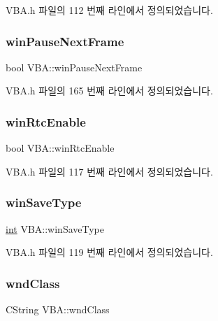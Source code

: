V\+B\+A.\+h 파일의 112 번째 라인에서 정의되었습니다.

\mbox{\label{class_v_b_a_a76ae27aad714b508806d1799afe97a50}} 
\subsubsection{\texorpdfstring{win\+Pause\+Next\+Frame}{winPauseNextFrame}}
{\footnotesize\ttfamily bool V\+B\+A\+::win\+Pause\+Next\+Frame}



V\+B\+A.\+h 파일의 165 번째 라인에서 정의되었습니다.

\mbox{\label{class_v_b_a_ae289fc4c9e951e0844900c522c151170}} 
\subsubsection{\texorpdfstring{win\+Rtc\+Enable}{winRtcEnable}}
{\footnotesize\ttfamily bool V\+B\+A\+::win\+Rtc\+Enable}



V\+B\+A.\+h 파일의 117 번째 라인에서 정의되었습니다.

\mbox{\label{class_v_b_a_a70060f88010280739406c87ef66d036a}} 
\subsubsection{\texorpdfstring{win\+Save\+Type}{winSaveType}}
{\footnotesize\ttfamily \mbox{\hyperlink{_util_8cpp_a0ef32aa8672df19503a49fab2d0c8071}{int}} V\+B\+A\+::win\+Save\+Type}



V\+B\+A.\+h 파일의 119 번째 라인에서 정의되었습니다.

\mbox{\label{class_v_b_a_acd3b584c09c85ec31168b1f7d1d8505e}} 
\subsubsection{\texorpdfstring{wnd\+Class}{wndClass}}
{\footnotesize\ttfamily C\+String V\+B\+A\+::wnd\+Class}



